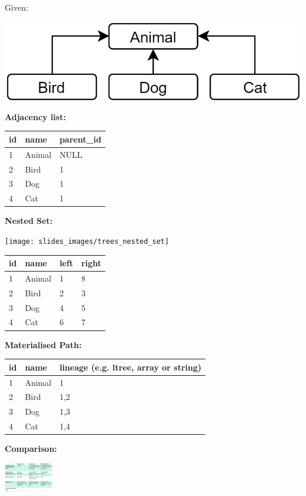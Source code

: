 \begin{breakbox}

Given:
\begin{center}
	\includegraphics[width=.08\textwidth]{slides_images/tree_given_example}
\end{center}

\textbf{Adjacency list:}

\begin{tabular}{lll}
id & name   & parent\_id \\
\hline
1  & Animal & NULL       \\
2  & Bird   & 1          \\
3  & Dog    & 1          \\
4  & Cat    & 1         
\end{tabular}

\textbf{Nested Set:}
\begin{center}
	\texttt{[image: slides\_images/trees\_nested\_set]}
\end{center}

\begin{tabular}{llll}
id & name   & left & right \\
\hline
1  & Animal & 1    & 8     \\
2  & Bird   & 2    & 3     \\
3  & Dog    & 4    & 5     \\
4  & Cat    & 6    & 7    
\end{tabular}

\textbf{Materialised Path:}

\begin{tabular}{lll}
id & name   & lineage (e.g. ltree, array or string) \\
\hline
1  & Animal & 1                    \\
2  & Bird   & 1,2                  \\
3  & Dog    & 1,3                  \\
4  & Cat    & 1,4                 
\end{tabular}
\textbf{Comparison:}
\begin{center}
	\includegraphics[width=0.16\textwidth]{slides_images/comparison_tree_data.png}
\end{center}
\end{breakbox}

